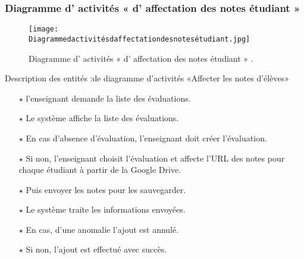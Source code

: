\subsubsection{Diagramme d' activités « d' affectation des notes étudiant » }
\begin{figure}[ht]
	\centering
	\texttt{[image: Diagrammedactivitésdaffectationdesnotesétudiant.jpg]}
	\caption{Diagramme d' activités « d' affectation des notes étudiant » .}
	\label{fig:Diagramme d' activités  d' affectation des notes étudiant   }
\end{figure}
\FloatBarrier


{\Large \color{cyan} Description des entités :de diagramme d’activités «Affecter les notes d’élèves» }
\begin{itemize}	
	
	
	
	\item[$\star$]  l'enseignant demande la liste des évaluations.
	\item[$\star$] Le système affiche la liste des évaluations.
	\item[$\star$] En cas d’absence d’évaluation, l'enseignant doit créer l’évaluation.
	\item[$\star$] Si non, l'enseignant choisit l’évaluation et affecte l'URL des notes pour chaque  étudiant  à partir de la Google Drive.
	\item[$\star$] Puis envoyer les notes pour les sauvegarder.
	\item[$\star$] Le système traite les informations envoyées.
	\item[$\star$] En cas, d’une anomalie l’ajout est annulé.
	\item[$\star$] Si non, l’ajout est effectué avec succès.
	
	
	


\end{itemize}
